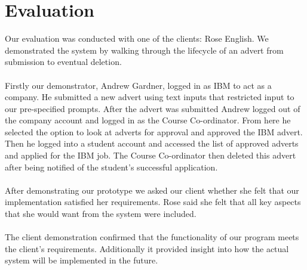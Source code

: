 \documentclass{l3deliverable}
\begin{document}

\section{Evaluation}

Our evaluation was conducted with one of the clients: Rose English. We demonstrated the system by walking through the lifecycle of an advert from submission to eventual deletion.\\
\\
Firstly our demonstrator, Andrew Gardner, logged in as IBM to act as a company. He submitted a new advert using text inputs that restricted input to our pre-specified prompts. After the advert was submitted Andrew logged out of the company account and logged in as the Course Co-ordinator. From here he selected the option to look at adverts for approval and approved the IBM advert. Then he logged into a student account and accessed the list of approved adverts and applied for the IBM job. The Course Co-ordinator then deleted this advert after being notified of the student's successful application.\\
\\
After demonstrating our prototype we asked our client whether she felt that
our implementation satisfied her requirements. Rose said she
felt that all key aspects that she would want from the system were
included.\\
\\
The client demonstration confirmed that the functionality of our
program meets the client's requirements. Additionally it
provided insight into how the actual system will be implemented in the future.

\end{document}
